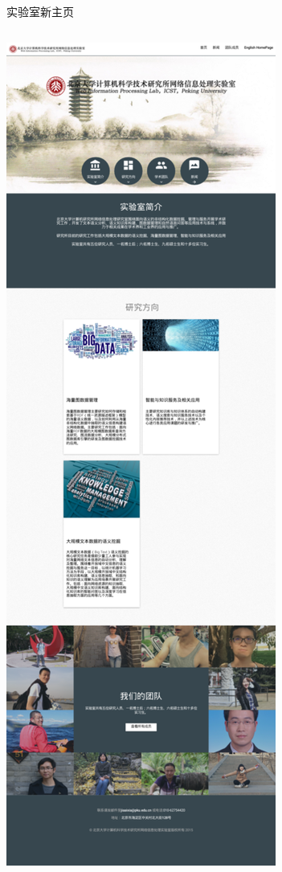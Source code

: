 \documentclass[color=usenames,dvipsnames]{beamer}
\begin{document}
\begin{frame}{实验室新主页}
\begin{columns}
 \column{0.15\hsize}
 \centering\includegraphics[height=0.7\textheight]{pic/wip-homepage15.png}
 \column{0.3\hsize}

\end{columns}
\end{frame}
\end{document}
